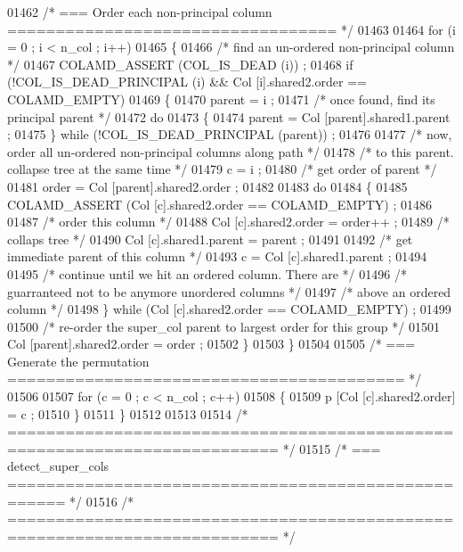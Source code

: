 \begin{DoxyCode}
{{{{{{{{{{{{{{{{{{{{{{{{{{{{01462   \textcolor{comment}{/* === Order each non-principal column ================================== */}
01463 
01464   \textcolor{keywordflow}{for} (i = 0 ; i < n\_col ; i++)
01465   \{
01466     \textcolor{comment}{/* find an un-ordered non-principal column */}
01467     COLAMD\_ASSERT (COL\_IS\_DEAD (i)) ;
01468     \textcolor{keywordflow}{if} (!COL\_IS\_DEAD\_PRINCIPAL (i) && Col [i].shared2.order == COLAMD\_EMPTY)
01469     \{
01470       parent = i ;
01471       \textcolor{comment}{/* once found, find its principal parent */}
01472       \textcolor{keywordflow}{do}
01473       \{
01474     parent = Col [parent].shared1.parent ;
01475       \} \textcolor{keywordflow}{while} (!COL\_IS\_DEAD\_PRINCIPAL (parent)) ;
01476 
01477       \textcolor{comment}{/* now, order all un-ordered non-principal columns along path */}
01478       \textcolor{comment}{/* to this parent.  collapse tree at the same time */}
01479       c = i ;
01480       \textcolor{comment}{/* get order of parent */}
01481       order = Col [parent].shared2.order ;
01482 
01483       \textcolor{keywordflow}{do}
01484       \{
01485     COLAMD\_ASSERT (Col [c].shared2.order == COLAMD\_EMPTY) ;
01486 
01487     \textcolor{comment}{/* order this column */}
01488     Col [c].shared2.order = order++ ;
01489     \textcolor{comment}{/* collaps tree */}
01490     Col [c].shared1.parent = parent ;
01491 
01492     \textcolor{comment}{/* get immediate parent of this column */}
01493     c = Col [c].shared1.parent ;
01494 
01495     \textcolor{comment}{/* continue until we hit an ordered column.  There are */}
01496     \textcolor{comment}{/* guarranteed not to be anymore unordered columns */}
01497     \textcolor{comment}{/* above an ordered column */}
01498       \} \textcolor{keywordflow}{while} (Col [c].shared2.order == COLAMD\_EMPTY) ;
01499 
01500       \textcolor{comment}{/* re-order the super\_col parent to largest order for this group */}
01501       Col [parent].shared2.order = order ;
01502     \}
01503   \}
01504 
01505   \textcolor{comment}{/* === Generate the permutation ========================================= */}
01506 
01507   \textcolor{keywordflow}{for} (c = 0 ; c < n\_col ; c++)
01508   \{
01509     p [Col [c].shared2.order] = c ;
01510   \}
01511 \}
01512 
01513 
01514 \textcolor{comment}{/* ========================================================================== */}
01515 \textcolor{comment}{/* === detect\_super\_cols ==================================================== */}
01516 \textcolor{comment}{/* ========================================================================== */}
}}}}}}}}}}}}}}}}}}}}}}}}}}}}
\end{DoxyCode}
